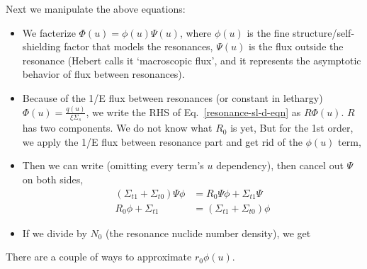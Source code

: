\documentclass{school-22.211-notes}
\begin{document}
Next we manipulate the above equations:
\begin{itemize}
\item We facterize $\Phi(u) = \phi(u) \Psi(u)$, where $\phi(u)$ is the fine structure/self-shielding factor that models the resonances, $\Psi(u)$ is the flux outside the resonance (Hebert calls it `macroscopic flux', and it represents the asymptotic behavior of flux between resonances). 

\item Because of the 1/E flux between resonances (or constant in lethargy) $\Phi(u) = \frac{q(u)}{\xi \Sigma_s}$, we write the RHS of Eq.~\ref{resonance-sl-d-eqn} as $R \Phi(u)$. $R$ has two components. We do not know what $R_0$ is yet,
But for the 1st order, we apply the 1/E flux between resonance part and get rid of the $\phi(u)$ term, 

\item Then we can write (omitting every term's $u$ dependency), then cancel out $\Psi$ on both sides, 
\begin{align}
 (\Sigma_{t1} + \Sigma_{t0}) \Psi \phi &= R_0 \Psi \phi +  \Sigma_{t1} \Psi    \\
R_0 \phi + \Sigma_{t1} &= (\Sigma_{t1}  + \Sigma_{t0} ) \phi 
\end{align}

\item If we divide by $N_0$ (the resonance nuclide number density), we get 
\end{itemize}


There are a couple of ways to approximate $r_0 \phi(u)$. 

\end{document}
